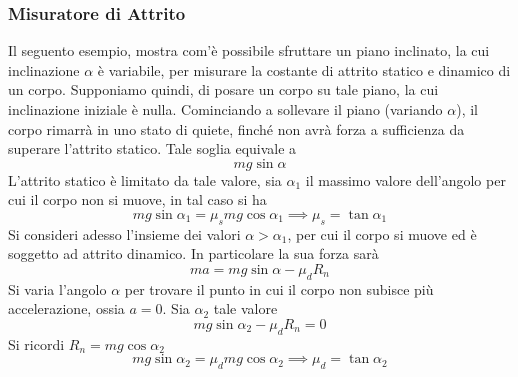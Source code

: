 \documentclass[10pt, letterpaper]{report}
\begin{document}
\subsubsection{Misuratore di Attrito}
Il seguento esempio, mostra com'è possibile sfruttare un piano inclinato, la cui inclinazione 
$\alpha$ è variabile, per misurare la costante di attrito statico e dinamico di un corpo. Supponiamo quindi, di posare un 
corpo su tale piano, la cui inclinazione iniziale è nulla. Cominciando a sollevare il piano (variando $\alpha$), il corpo 
rimarrà in uno stato di quiete, finché non avrà forza a sufficienza da superare l'attrito statico. Tale 
soglia equivale a $$mg\sin\alpha $$
L'attrito statico è limitato da tale valore, sia $\alpha_1$ il massimo valore dell'angolo per cui 
il corpo non si muove, in tal caso si ha 
$$ mg\sin\alpha_1=\mu_smg\cos\alpha_1\implies\mu_s=\tan\alpha_1$$
Si consideri adesso l'insieme dei valori $\alpha>\alpha_1$, per cui il corpo si muove ed è soggetto 
ad attrito dinamico. In particolare la sua forza sarà 
$$ma=mg\sin\alpha-\mu_dR_n $$
Si varia l'angolo $\alpha$ per trovare il punto in cui il corpo non subisce più accelerazione, ossia $a=0$. Sia 
$\alpha_2$ tale valore 
$$ mg\sin\alpha_2-\mu_dR_n=0$$
Si ricordi $R_n=mg\cos\alpha_2$
$$ mg\sin\alpha_2=\mu_dmg\cos\alpha_2\implies \mu_d=\tan\alpha_2$$
\flowerLine 
\end{document}
